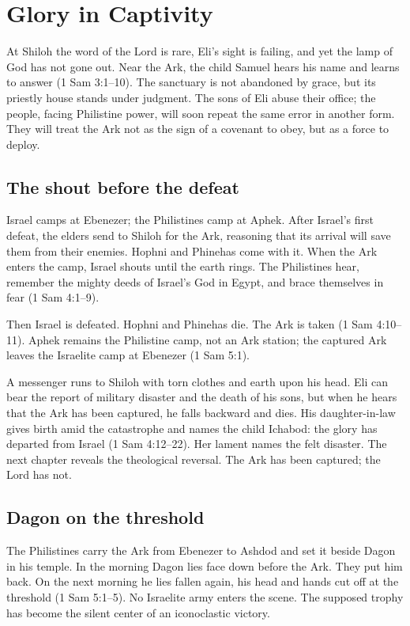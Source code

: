 \section{Glory in Captivity}

At Shiloh the word of the Lord is rare, Eli's sight is failing, and yet the lamp
of God has not gone out.  Near the Ark, the child Samuel hears his name and
learns to answer (1 Sam 3:1--10).  The sanctuary is not abandoned by grace, but
its priestly house stands under judgment.  The sons of Eli abuse their office;
the people, facing Philistine power, will soon repeat the same error in another
form.  They will treat the Ark not as the sign of a covenant to obey, but as a
force to deploy.

\subsection{The shout before the defeat}

Israel camps at Ebenezer; the Philistines camp at Aphek.  After Israel's first
defeat, the elders send to Shiloh for the Ark, reasoning that its arrival will
save them from their enemies.  Hophni and Phinehas come with it.  When the Ark
enters the camp, Israel shouts until the earth rings.  The Philistines hear,
remember the mighty deeds of Israel's God in Egypt, and brace themselves in
fear (1 Sam 4:1--9).

Then Israel is defeated.  Hophni and Phinehas die.  The Ark is taken
(1 Sam 4:10--11).  Aphek remains the Philistine camp, not an Ark station; the
captured Ark leaves the Israelite camp at Ebenezer (1 Sam 5:1).

A messenger runs to Shiloh with torn clothes and earth upon his head.  Eli can
bear the report of military disaster and the death of his sons, but when he
hears that the Ark has been captured, he falls backward and dies.  His
daughter-in-law gives birth amid the catastrophe and names the child Ichabod:
the glory has departed from Israel (1 Sam 4:12--22).  Her lament names the
felt disaster.  The next chapter reveals the theological reversal.  The Ark
has been captured; the Lord has not.

\subsection{Dagon on the threshold}

The Philistines carry the Ark from Ebenezer to Ashdod and set it beside Dagon
in his temple.  In the morning Dagon lies face down before the Ark.  They put
him back.  On the next morning he lies fallen again, his head and hands cut off
at the threshold (1 Sam 5:1--5).  No Israelite army enters the scene.  The
supposed trophy has become the silent center of an iconoclastic victory.

